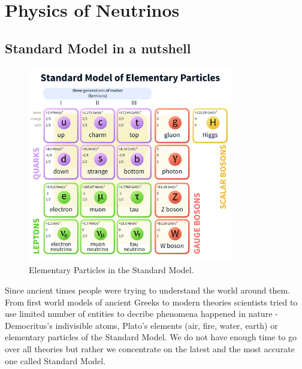 \chapter{Physics of Neutrinos}
\label{neutrino_physics_chapter}

\section{Standard Model in a nutshell}
\begin{figure}
\includegraphics[width=0.8\textwidth]{figures/Standard_Model_of_Elementary_Particles.png}
\centering
\caption{Elementary Particles in the Standard Model.} 
\end{figure}
Since ancient times people were trying to understand the world around them. From 
first world models of ancient Greeks to modern theories scientists tried to use 
limited number of entities to decribe phenomena happened in nature - Democritus's 
indivisible atoms, Plato's elements (air, fire, water, earth) or elementary particles 
of the Standard Model. We do not have enough time to go over all theories but rather we 
concentrate on the latest and the most accurate one called Standard Model. 

